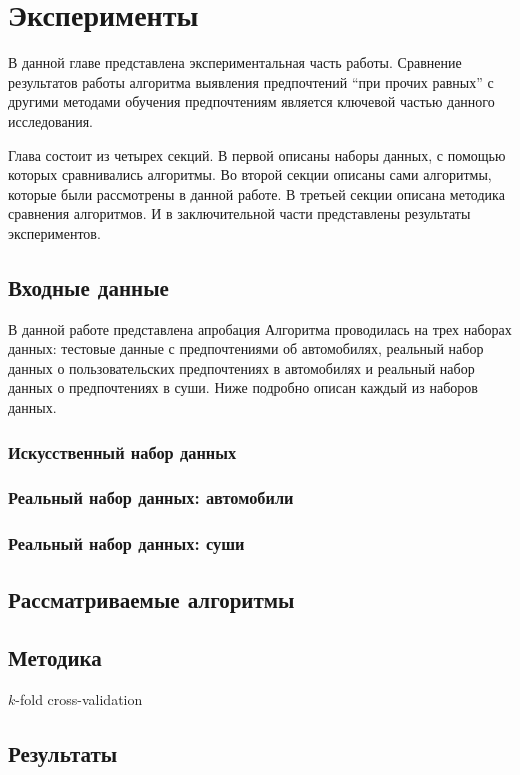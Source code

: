 \chapter{Эксперименты}
\label{chapter:experiments}
В данной главе представлена экспериментальная часть работы. Сравнение результатов работы алгоритма выявления предпочтений \enquote{при прочих равных} с другими методами обучения предпочтениям является ключевой частью данного исследования.

Глава состоит из четырех секций. В первой описаны наборы данных, с помощью которых сравнивались алгоритмы. Во второй секции описаны сами алгоритмы, которые были рассмотрены в данной работе. В третьей секции описана методика сравнения алгоритмов. И в заключительной части представлены результаты экспериментов.

\section{Входные данные}
	В данной работе представлена
	апробация Алгоритма проводилась на трех наборах данных: тестовые данные с предпочтениями об автомобилях, реальный набор данных о пользовательских предпочтениях в автомобилях %
	и реальный набор данных о предпочтениях в суши. Ниже подробно описан каждый из наборов данных.
	
	\subsection{Искусственный набор данных}
	\subsection{Реальный набор данных: автомобили}
	\subsection{Реальный набор данных: суши}
	
\section{Рассматриваемые алгоритмы}

\section{Методика}

$k$-fold cross-validation

\section{Результаты}